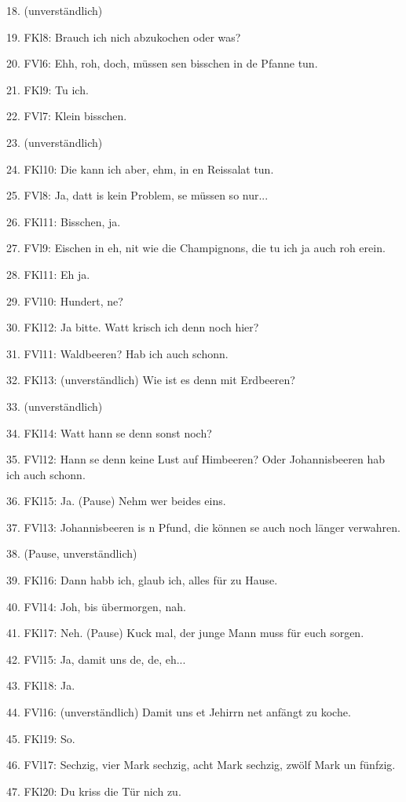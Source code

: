 \documentclass[
]{article}
\begin{document}
18. (unverständlich)

19. FKl8: Brauch ich nich abzukochen oder was?

20. FVl6: Ehh, roh, doch, müssen se\textquotesingle n bisschen in de
Pfanne tun.

21. FKl9: Tu ich.

22. FVl7: Klein bisschen.

23. (unverständlich)

24. FKl10: Die kann ich aber, ehm, in en Reissalat tun.

25. FVl8: Ja, datt is kein Problem, se müssen so nur...

26. FKl11: Bisschen, ja.

27. FVl9: Eischen in eh, nit wie die Champignons, die tu ich ja auch roh
erein.

28. FKl11: Eh ja.

29. FVl10: Hundert, ne?

30. FKl12: Ja bitte. Watt krisch ich denn noch hier?

31. FVl11: Waldbeeren? Hab ich auch schonn.

32. FKl13: (unverständlich) Wie ist es denn mit Erdbeeren?

33. (unverständlich)

34. FKl14: Watt hann se denn sonst noch?

35. FVl12: Hann se denn keine Lust auf Himbeeren? Oder Johannisbeeren
hab ich auch schonn.

36. FKl15: Ja. (Pause) Nehm wer beides eins.

37. FVl13: Johannisbeeren is \textquotesingle n Pfund, die können se
auch noch länger verwahren.

38. (Pause, unverständlich)

39. FKl16: Dann habb ich, glaub ich, alles für zu Hause.

40. FVl14: Joh, bis übermorgen, nah.

41. FKl17: Neh. (Pause) Kuck mal, der junge Mann muss für euch sorgen.

42. FVl15: Ja, damit uns de, de, eh...

43. FKl18: Ja.

44. FVl16: (unverständlich) Damit uns et Jehirrn net anfängt zu koche.

45. FKl19: So.

46. FVl17: Sechzig, vier Mark sechzig, acht Mark sechzig, zwölf Mark un
fünfzig.

47. FKl20: Du kriss die Tür nich zu.
\end{document}
